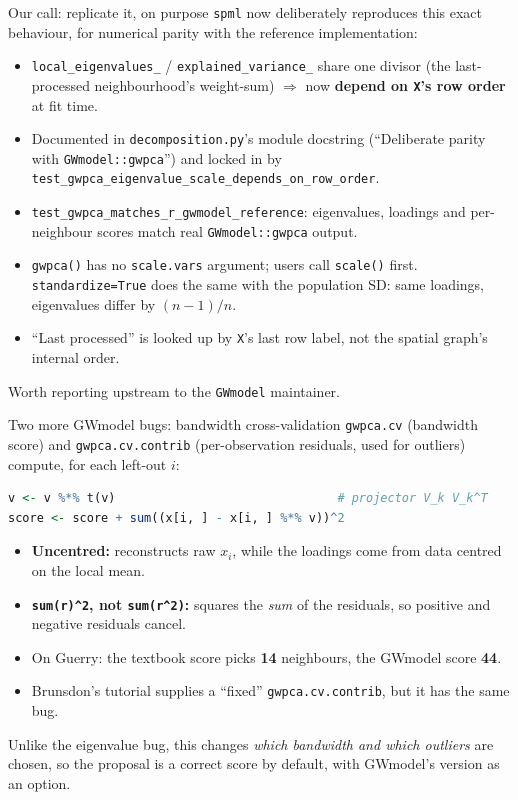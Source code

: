 \documentclass[10pt]{beamer}
\begin{document}
\begin{frame}[fragile]{Our call: replicate it, on purpose}
  \texttt{spml} now deliberately reproduces this exact behaviour, for
  numerical parity with the reference implementation:
  \begin{itemize}
    \item \texttt{local\_eigenvalues\_} / \texttt{explained\_variance\_}
      share one divisor (the last-processed neighbourhood's weight-sum)
      $\Rightarrow$ now \textbf{depend on \texttt{X}'s row order} at fit time.
    \item Documented in \texttt{decomposition.py}'s module docstring
      (``Deliberate parity with \texttt{GWmodel::gwpca}'') and locked in by
      \texttt{test\_gwpca\_eigenvalue\_scale\_depends\_on\_row\_order}.
    \item \texttt{test\_gwpca\_matches\_r\_gwmodel\_reference}: eigenvalues,
      loadings and per-neighbour scores match real \texttt{GWmodel::gwpca}
      output.
    \item \texttt{gwpca()} has no \texttt{scale.vars} argument; users call
      \texttt{scale()} first. \texttt{standardize=True} does the same with
      the population SD: same loadings, eigenvalues differ by $(n-1)/n$.
    \item ``Last processed'' is looked up by \texttt{X}'s last row label, not
      the spatial graph's internal order.
  \end{itemize}
  \vfill
  \centering
  \footnotesize Worth reporting upstream to the \texttt{GWmodel} maintainer.
\end{frame}

\begin{frame}[fragile]{Two more GWmodel bugs: bandwidth cross-validation}
  \texttt{gwpca.cv} (bandwidth score) and \texttt{gwpca.cv.contrib}
  (per-observation residuals, used for outliers) compute, for each left-out
  $i$:
\begin{lstlisting}[language=R]
v <- v %*% t(v)                               # projector V_k V_k^T
score <- score + sum((x[i, ] - x[i, ] %*% v))^2
\end{lstlisting}
  \begin{itemize}
    \item \textbf{Uncentred:} reconstructs raw $x_i$, while the loadings come
      from data centred on the local mean.
    \item \textbf{\texttt{sum(r)\^{}2}, not \texttt{sum(r\^{}2)}:} squares the
      \emph{sum} of the residuals, so positive and negative residuals cancel.
    \item On Guerry: the textbook score picks \textbf{14} neighbours, the
      GWmodel score \textbf{44}.
    \item Brunsdon's tutorial supplies a ``fixed'' \texttt{gwpca.cv.contrib},
      but it has the same bug.
  \end{itemize}
  \vfill
  \centering
  \footnotesize Unlike the eigenvalue bug, this changes \emph{which bandwidth
  and which outliers} are chosen, so the proposal is a correct score by
  default, with GWmodel's version as an option.
\end{frame}
\end{document}
